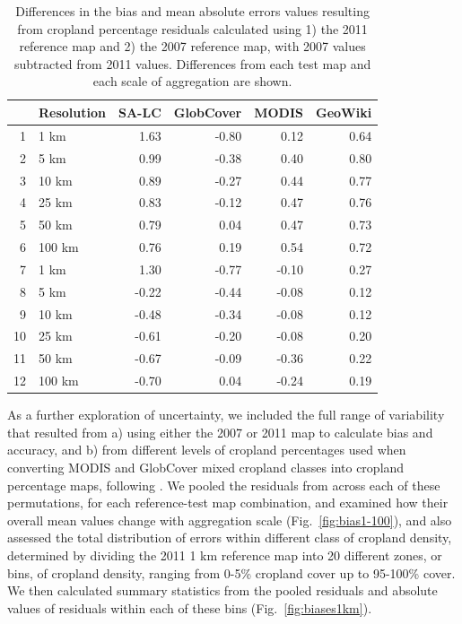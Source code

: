 \documentclass[12pt, titlepage]{article}
\begin{document}

\begin{spacing}{1.0}
\begin{table}[!ht]
\caption{Differences in the bias and mean absolute errors values resulting from cropland percentage residuals calculated using 1) the 2011 reference map and 2) the 2007 reference map, with 2007 values subtracted from 2011 values. Differences from each test map and each scale of aggregation are shown. }
\centering
\begin{tabular}{rlrrrr}
  \hline
 & Resolution & SA-LC & GlobCover & MODIS & GeoWiki \\ 
  \hline
1 & 1 km & 1.63 & -0.80 & 0.12 & 0.64 \\ 
  2 & 5 km & 0.99 & -0.38 & 0.40 & 0.80 \\ 
  3 & 10 km & 0.89 & -0.27 & 0.44 & 0.77 \\ 
  4 & 25 km & 0.83 & -0.12 & 0.47 & 0.76 \\ 
  5 & 50 km & 0.79 & 0.04 & 0.47 & 0.73 \\ 
  6 & 100 km & 0.76 & 0.19 & 0.54 & 0.72 \\ 
  7 & 1 km & 1.30 & -0.77 & -0.10 & 0.27 \\ 
  8 & 5 km & -0.22 & -0.44 & -0.08 & 0.12 \\ 
  9 & 10 km & -0.48 & -0.34 & -0.08 & 0.12 \\ 
  10 & 25 km & -0.61 & -0.20 & -0.08 & 0.20 \\ 
  11 & 50 km & -0.67 & -0.09 & -0.36 & 0.22 \\ 
  12 & 100 km & -0.70 & 0.04 & -0.24 & 0.19 \\ 
   \hline
\end{tabular}
\end{table}
\end{spacing}

\vspace{10 pt}
As a further exploration of uncertainty, we included the full range of variability that resulted from a) using either the 2007 or 2011 map to calculate bias and accuracy, and b) from different levels of cropland percentages used when converting MODIS and GlobCover mixed cropland classes into cropland percentage maps, following \citet{fritz_mapping_2015}. We pooled the residuals from across each of these permutations, for each reference-test map combination, and examined how their overall mean values change with aggregation scale (Fig.~\ref{fig:bias1-100}), and also assessed the total distribution of errors within different class of cropland density, determined by dividing the 2011 1 km reference map into 20 different zones, or bins, of cropland density, ranging from 0-5\% cropland cover up to 95-100\% cover. We then calculated summary statistics from the pooled residuals and absolute values of residuals within each of these bins (Fig.~\ref{fig:biases1km}).   
\end{document}
